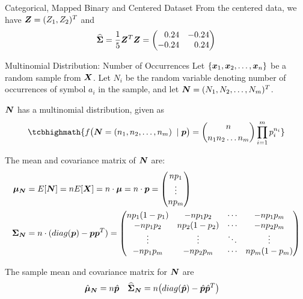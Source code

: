 \begin{frame}{Categorical, Mapped Binary and Centered Dataset}
	From the centered data, we have ${\boldsymbol Z} = (Z_1, Z_2)^T$ and
    \begin{align*}
	  \hcov = {1 \over 5}\bZ^T\bZ = \amatr{r}{0.24 & -0.24\\-0.24 & 0.24}
    \end{align*}
\end{frame}


\begin{frame}{Multinomial Distribution: Number of Occurrences}
  \small
Let $\{{\boldsymbol x}_1, {\boldsymbol x}_2, \dots, {\boldsymbol x}_n\}$ be a random sample from ${\boldsymbol X}$.
Let $N_i$ be the random variable denoting number of
occurrences of symbol $a_i$ in the sample, and
let ${\boldsymbol N} = (N_1, N_2, \dots, N_m)^T$.

${\boldsymbol N}$ has a
multinomial distribution, given as
\begin{align*}
\tcbhighmath{
    f\bigl(\bN = (n_1,n_2,\dots,n_m)\;\; |\; \bp\bigr)  =
    {n \choose n_1 n_2 \dots n_m} \prod_{i=1}^m p_i^{n_i}
}
\end{align*}

The mean and covariance matrix of ${\boldsymbol N}$ are:
\begin{align*}
    \bmu_\bN & = E[\bN] = n E[\bX] = n \cdot \bmu = n \cdot \bp =
    \matr{n p_1\\ \vdots\\n p_m}\\
    \cov_\bN & = n \cdot (diag(\bp) - \bp\bp^T) =
    \amatr{c}{n p_1(1-p_1) & -n p_1p_2 & \cdots & -n p_1p_m\\
    -n p_1p_2 & n p_2(1-p_2) & \cdots & -n p_2p_m\\
    \vdots & \vdots & \ddots & \vdots\\
    -n p_1p_m & -n p_2p_m & \cdots & n p_m(1-p_m)\\
    }
\end{align*}

The sample mean and covariance matrix for ${\boldsymbol N}$ are
\begin{align*}
    \hat{{\bm \mu}}_{\boldsymbol N} & = n \hat{{\boldsymbol p}} & \widehat{{\bm \Sigma}}_{\boldsymbol N} &= n \bigl(diag(\hat{{\boldsymbol p}}) - \hat{{\boldsymbol p}} \hat{{\boldsymbol p}}^T\bigr)
\end{align*}
\end{frame}


